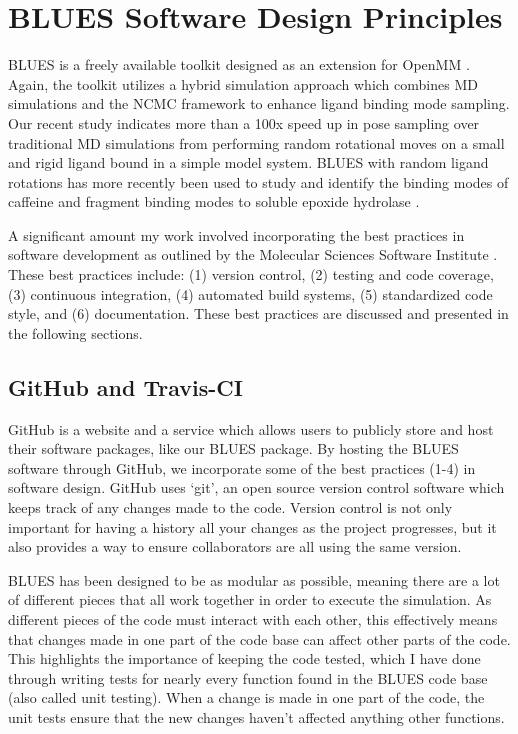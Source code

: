 \section{BLUES Software Design Principles}
BLUES\cite{BLUESGitHub} is a freely available toolkit designed as an extension for OpenMM \cite{eastman2010openmm}.
Again, the toolkit utilizes a hybrid simulation approach which combines MD simulations and the NCMC \cite{Nilmeier08112011} framework to enhance ligand binding mode sampling.
Our recent study \cite{BLUESpaper} indicates more than a 100x speed up in pose sampling over traditional MD simulations from performing random rotational moves on a small and rigid ligand bound in a simple model system.
BLUES with random ligand rotations has more recently been used to study and identify the binding modes of caffeine \cite{BLUEScaffeine} and fragment binding modes to soluble epoxide hydrolase \cite{}.

A significant amount my work involved incorporating the best practices in software development as outlined by the Molecular Sciences Software Institute \cite{molssi}.
These best practices include: (1) version control, (2) testing and code coverage, (3) continuous integration, (4) automated build systems, (5) standardized code style, and (6) documentation.
These best practices are discussed and presented in the following sections.


\subsection{GitHub and Travis-CI}
GitHub is a website and a service which allows users to publicly store and host their software packages, like our BLUES package.
By hosting the BLUES software through GitHub, we incorporate some of the best practices (1-4) in software design.
GitHub uses `git', an open source version control software which keeps track of any changes made to the code.
Version control is not only important for having a history all your changes as the project progresses, but it also provides a way to ensure collaborators are all using the same version.

BLUES has been designed to be as modular as possible, meaning there are a lot of different pieces that all work together in order to execute the simulation.
As different pieces of the code must interact with each other, this effectively means that changes made in one part of the code base can affect other parts of the code.
This highlights the importance of keeping the code tested, which I have done through writing tests for nearly every function found in the BLUES code base (also called unit testing).
When a change is made in one part of the code, the unit tests ensure that the new changes haven't affected anything other functions.

